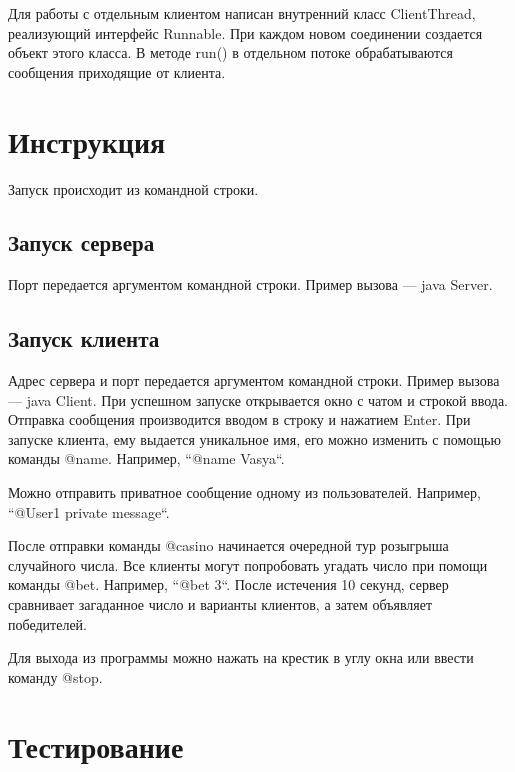 \documentclass{article}
\begin{document}
Для работы с отдельным клиентом написан внутренний класс ClientThread, реализующий интерфейс Runnable. При каждом новом соединении создается объект этого класса. В методе run() в отдельном потоке обрабатываются сообщения приходящие от клиента.

\section{Инструкция}
Запуск происходит из командной строки.

\subsection{Запуск сервера}
Порт передается аргументом командной строки. Пример вызова --- java Server.

\subsection{Запуск клиента}
Адрес сервера и порт передается аргументом командной строки. Пример вызова --- java Client. При успешном запуске открывается окно с чатом и строкой ввода. Отправка сообщения производится вводом в строку и нажатием Enter.
При запуске клиента, ему выдается уникальное имя, его можно изменить с помощью команды @name. Например, ``@name Vasya``. 

Можно отправить приватное сообщение одному из пользователей. Например, ``@User1 private message``.

После отправки команды @casino начинается очередной тур розыгрыша случайного числа. Все клиенты могут попробовать угадать число при помощи команды @bet. Например, ``@bet 3``. После истечения 10 секунд, сервер сравнивает загаданное число и варианты клиентов, а затем объявляет победителей.

Для выхода из программы можно нажать на крестик в углу окна или ввести команду @stop.

\section{Тестирование}
\end{document}
